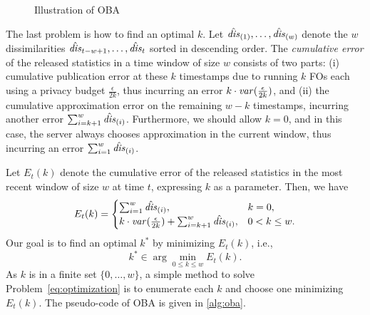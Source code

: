 \begin{figure}[htp]
  \centering
  
  \caption{Illustration of OBA}
  \label{fig:OBA}
\end{figure}


The last problem is how to find an optimal $k$.
Let $\hat{\mathit{dis}}_{(1)},\dots,\hat{\mathit{dis}}_{(w)}$ denote the $w$ dissimilarities
$\hat{\mathit{dis}}_{t-w+1}, \dots, \hat{\mathit{dis}}_t$ sorted in descending order.
The \emph{cumulative error} of the released statistics in a time window of size
$w$ consists of two parts: (i) cumulative publication error at these $k$
timestamps due to running $k$ FOs each using a privacy budget
$\frac{\epsilon}{2k}$, thus incurring an error
$k\cdot\mathit{var}(\frac{\epsilon}{2k})$, and (ii) the cumulative approximation error
on the remaining $w-k$ timestamps, incurring another error
$\sum_{i=k+1}^w\hat{\mathit{dis}}_{(i)}$.
Furthermore, we should allow $k=0$, and in this case, the server always chooses
approximation in the current window, thus incurring an error
$\sum_{i=1}^w\hat{\mathit{dis}}_{(i)}$.

Let $E_t(k)$ denote the cumulative error of the released statistics in the most
recent window of size $w$ at time $t$, expressing $k$ as a parameter.
Then, we have
\[
  E_t(k) =
  \begin{cases}
    \sum_{i=1}^w \hat{\mathit{dis}}_{(i)}, & k=0, \\
    k \cdot \mathit{var}(\frac{\epsilon}{2k}) + \sum_{i=k+1}^w\hat{\mathit{dis}}_{(i)}, & 0<k\le w.
  \end{cases}
\]
Our goal is to find an optimal $k^*$ by minimizing $E_t(k)$, i.e.,
\begin{equation}\label{eq:optimization}
  k^* \in \arg\min_{0\le k\le w} E_t(k).
\end{equation}
As $k$ is in a finite set $\{0,\ldots,w\}$, a simple method to solve
Problem~\eqref{eq:optimization} is to enumerate each $k$ and choose one
minimizing $E_t(k)$.
The pseudo-code of OBA is given in \cref{alg:oba}.

